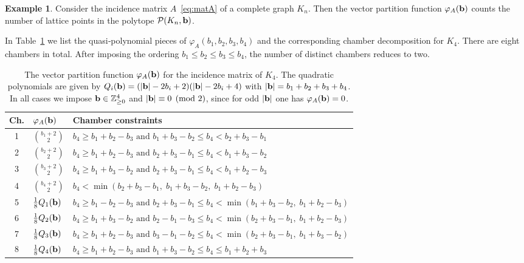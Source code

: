 \documentclass[12pt,a4paper]{extarticle}
\theoremstyle{definition}
\newtheorem{example}[theorem]{Example}
\begin{document}
\begin{example}
Consider the incidence matrix $A$~\eqref{eq:matA} of a complete graph $K_n$. Then the vector partition function $\varphi_{A}({\bf b})$ counts the number of lattice points in the polytope $\mathcal{P}(K_n,{\bf b})$. 

\smallskip

In Table~\ref{tab: K4 chambers} we list the quasi‑polynomial pieces of $\varphi_A({b_1,b_2,b_3,b_4})$ and the
corresponding chamber decomposition for $K_4$.
There are eight chambers in total. After imposing the ordering $b_1\le b_2\le b_3\le b_4$, the number of distinct chambers
reduces to two.
\begin{table}[ht]
\centering
\renewcommand{\arraystretch}{1.4}
\small
\begin{tabular}{c p{1.5cm} p{12cm}}
\hline
\textbf{Ch.} & $\varphi_A({\bf b})$ & \textbf{Chamber constraints} \\
\hline
1 &
${b_1 + 2 \choose 2}$ &
$
 b_4 \ge b_1 + b_2 - b_3 \text{ and } b_1 + b_3 -b_2 \le b_4 <  b_2 + b_3-b_1
$ \\[2pt]

2 &
${b_2 + 2 \choose 2}$ &
$
 b_4 \ge b_1 + b_2 - b_3 \text{ and } b_2 + b_3 -b_1 \le b_4 <  b_1 + b_3-b_2
$ \\[2pt]

3 &
${b_3 + 2 \choose 2}$ &
$
 b_4 \ge b_1 + b_3 - b_2 \text{ and } b_2 + b_3 -b_1 \le b_4 <  b_1 + b_2-b_3
$ \\[2pt]

4 &
${b_4 + 2 \choose 2}$ &
$
 b_4 < \min(b_2 + b_3 - b_1, \; b_1 + b_3 -b_2, \;b_1 + b_2-b_3)
$ \\[2pt]

5 &
$\tfrac{1}{8}Q_1({\bf b})$ &
$b_4 \ge b_1 - b_2 - b_3 \text{ and } b_2 + b_3 - b_1 \le b_4 < \min(b_1+b_3 - b_2, \;b_1 + b_2 - b_3)$ \\[2pt]

6 &
$\tfrac{1}{8}Q_2({\bf b})$ &
$b_4 \ge b_1 + b_3 - b_2 \text{ and } b_2 - b_1 - b_3 \le b_4 < \min(b_2+b_3 - b_1, \; b_1 + b_2 - b_3)$ \\[2pt]

7 &
$\tfrac{1}{8}Q_3({\bf b})$ &
$b_4 \ge b_1 + b_2 - b_3 \text{ and } b_3 - b_1 - b_2 \le b_4 < \min(b_2+b_3 - b_1, \; b_1 + b_3 - b_2)$ \\[2pt]

8 &
$\tfrac{1}{8}Q_4({\bf b})$ &
$b_4 \ge b_1 + b_2 - b_3 \text{ and } b_1 + b_3 - b_2 \le b_4 \le b_1+b_2+b_3$ \\[1pt]
\hline
\end{tabular}
\caption{The vector partition function $\varphi_A({\bf b})$ for the incidence matrix of $K_4$.
The quadratic polynomials are given by
$
Q_i({\bf b})=(|{\bf b}|-2b_i+2)(|{\bf b}|-2b_i+4)$ with
$|{\bf b}|=b_1+b_2+b_3+b_4$.
In all cases we impose ${\bf b}\in\mathbb{Z}_{\ge0}^4$ and $|{\bf b}|\equiv0\pmod2$, since for odd $|{\bf b}|$ one has $\varphi_A({\bf b}) = 0$.}
\label{tab: K4 chambers}
\end{table}


\end{example}
\end{document}
